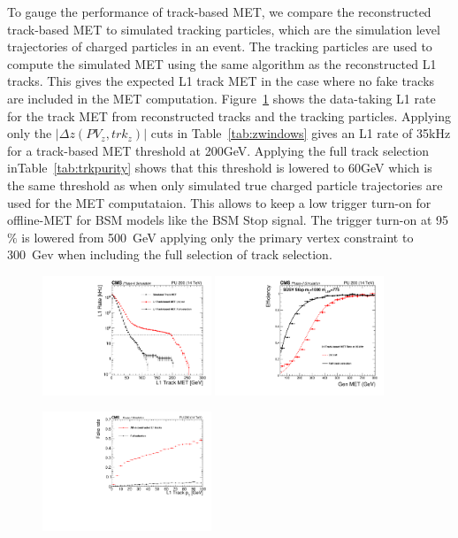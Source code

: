 To gauge the performance of track-based MET, we compare the reconstructed track-based MET to simulated tracking particles, which are the simulation level trajectories of charged particles in an event. The tracking particles are used to compute the simulated MET using the same algorithm as the reconstructed L1 tracks. This gives the expected L1 track MET in the case where no fake tracks are included in the MET computation. Figure~\ref{fig:TkMETPerformance} shows the data-taking L1 rate for the track MET from reconstructed tracks and the tracking particles. Applying only the $\vert \Delta z\left(PV_{z}, trk_{z}\right) \vert$ cuts in Table~\ref{tab:zwindows} gives an L1 rate of 35kHz for a track-based MET threshold at 200GeV. Applying the full track selection inTable~\ref{tab:trkpurity} shows that this threshold is lowered to 60GeV which is the same threshold as when only simulated true charged particle trajectories are used for the MET computataion.
This allows to keep a low trigger turn-on for offline-MET for BSM models like the BSM Stop signal. The trigger turn-on at 95$\%$ is lowered from 500~GeV applying only the primary vertex constraint to 300~Gev when including the full selection of track selection.
\begin{figure}
\includegraphics[width=0.45\textwidth ]{MinBiasTKMETRatePlot.pdf}
\includegraphics[width=0.45\textwidth ]{turnonMET.pdf}
\caption{}
\label{fig:TkMETPerformance}
\end{figure}


\begin{figure}
\includegraphics[width=0.45\textwidth ]{StopSamplePUFakeRatePt.pdf}
\caption{}
\label{fig:TkFakeRate}
\end{figure}

